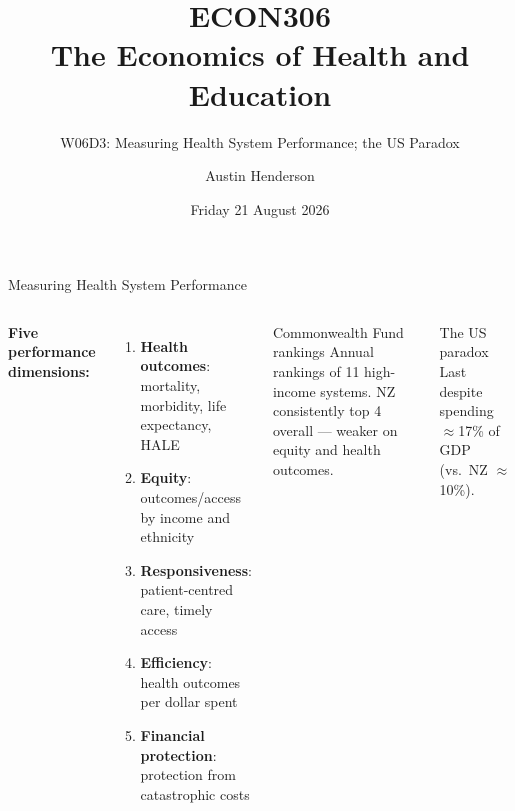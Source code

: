 \documentclass[aspectratio=169, 12pt]{beamer}
\title[ECON306: W06D3 — Performance \& US Paradox]{ECON306\\The Economics of Health and Education}
\subtitle{W06D3: Measuring Health System Performance; the US Paradox}
\author{Austin Henderson}
\institute{Department of Economics\\University of Otago}
\date{Friday 21 August 2026}
\begin{document}
\begin{frame}[plain]
  \titlepage
\end{frame}



\begin{frame}{Measuring Health System Performance}
  \begin{columns}
      \small\textbf{Five performance dimensions:}
      \begin{enumerate}\small
        \item \textbf{Health outcomes}: mortality, morbidity, life expectancy, HALE
        \item \textbf{Equity}: outcomes/access by income and ethnicity
        \item \textbf{Responsiveness}: patient-centred care, timely access
        \item \textbf{Efficiency}: health outcomes per dollar spent
        \item \textbf{Financial protection}: protection from catastrophic costs
      \end{enumerate}
      \begin{block}{Commonwealth Fund rankings}
        \small Annual rankings of 11 high-income systems. NZ consistently top 4 overall --- weaker on equity and health outcomes.
      \end{block}
      \begin{alertblock}{The US paradox}
        \small Last despite spending $\approx$17\% of GDP (vs.\ NZ $\approx$10\%).
      \end{alertblock}
  \end{columns}
\end{frame}
\end{document}
